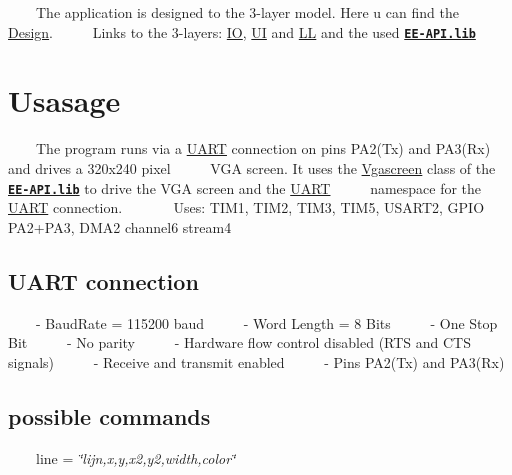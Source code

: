 ~~~~The application is designed to the 3-\/layer model. Here u can find the \mbox{\hyperlink{_design}{Design}}.~\newline
 ~~~~Links to the 3-\/layers\+: \mbox{\hyperlink{namespace_i_o}{IO}}, \mbox{\hyperlink{namespace_u_i}{UI}} and \mbox{\hyperlink{namespace_l_l}{LL}} and the used {\bfseries \href{_e_e-_a_p_i_8lib.html}{\tt E\+E-\/\+A\+P\+I.\+lib}}~\newline
\hypertarget{index_usage_sec}{}\section{Usasage}\label{index_usage_sec}
~~~~The program runs via a \mbox{\hyperlink{namespace_u_a_r_t}{U\+A\+RT}} connection on pins P\+A2(\+Tx) and P\+A3(\+Rx) and drives a 320x240 pixel~\newline
 ~~~~V\+GA screen. It uses the \mbox{\hyperlink{class_vgascreen}{Vgascreen}} class of the {\bfseries \href{_e_e-_a_p_i_8lib.html}{\tt E\+E-\/\+A\+P\+I.\+lib}} to drive the V\+GA screen and the \mbox{\hyperlink{namespace_u_a_r_t}{U\+A\+RT}}~\newline
 ~~~~namespace for the \mbox{\hyperlink{namespace_u_a_r_t}{U\+A\+RT}} connection.~\newline
 ~\newline
 ~~~~Uses\+: T\+I\+M1, T\+I\+M2, T\+I\+M3, T\+I\+M5, U\+S\+A\+R\+T2, G\+P\+IO P\+A2+\+P\+A3, D\+M\+A2 channel6 stream4\hypertarget{index_uart_sec}{}\subsection{U\+A\+R\+T connection}\label{index_uart_sec}
~~~~-\/ Baud\+Rate = 115200 baud~\newline
 ~~~~-\/ Word Length = 8 Bits~\newline
 ~~~~-\/ One Stop Bit~\newline
 ~~~~-\/ No parity~\newline
 ~~~~-\/ Hardware flow control disabled (R\+TS and C\+TS signals)~\newline
 ~~~~-\/ Receive and transmit enabled~\newline
 ~~~~-\/ Pins P\+A2(\+Tx) and P\+A3(\+Rx)~\newline
\hypertarget{index_input_sec}{}\subsection{possible commands}\label{index_input_sec}
~~~~line = {\itshape \char`\"{}lijn,x,y,x2,y2,width,color\char`\"{}}~\newline
